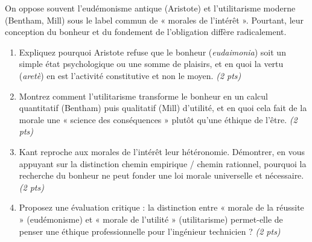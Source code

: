 \documentclass[11pt]{article}
\begin{document}
\begin{exercice}
On oppose souvent l'eudémonisme antique (Aristote) et l'utilitarisme moderne (Bentham, Mill) sous le label commun de « morales de l'intérêt ». Pourtant, leur conception du bonheur et du fondement de l'obligation diffère radicalement.
\begin{enumerate}
    \item Expliquez pourquoi Aristote refuse que le bonheur (\textit{eudaimonia}) soit un simple état psychologique ou une somme de plaisirs, et en quoi la vertu (\textit{aretè}) en est l'activité constitutive et non le moyen. \textit{(2 pts)}
    \item Montrez comment l'utilitarisme transforme le bonheur en un calcul quantitatif (Bentham) puis qualitatif (Mill) d'utilité, et en quoi cela fait de la morale une « science des conséquences » plutôt qu'une éthique de l'être. \textit{(2 pts)}
    \item Kant reproche aux morales de l'intérêt leur hétéronomie. Démontrer, en vous appuyant sur la distinction chemin empirique / chemin rationnel, pourquoi la recherche du bonheur ne peut fonder une loi morale universelle et nécessaire. \textit{(2 pts)}
    \item Proposez une évaluation critique : la distinction entre « morale de la réussite » (eudémonisme) et « morale de l'utilité » (utilitarisme) permet-elle de penser une éthique professionnelle pour l'ingénieur technicien ? \textit{(2 pts)}
\end{enumerate}
\end{exercice}
\end{document}
